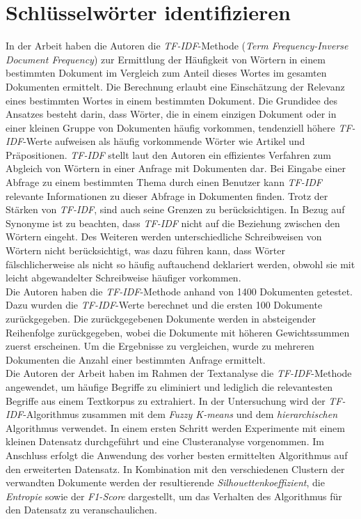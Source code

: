 \section{Schlüsselwörter identifizieren}
In der Arbeit \cite{ramos2003using} haben die Autoren \citeauthor{ramos2003using} die \emph{TF-IDF}-Methode (\emph{Term Frequency-Inverse Document Frequency}) zur Ermittlung der Häufigkeit von Wörtern in einem bestimmten Dokument im Vergleich zum Anteil dieses Wortes im gesamten Dokumenten ermittelt. Die Berechnung erlaubt eine Einschätzung der Relevanz eines bestimmten Wortes in einem bestimmten Dokument. Die Grundidee des Ansatzes besteht darin, dass Wörter, die in einem einzigen Dokument oder in einer kleinen Gruppe von Dokumenten häufig vorkommen, tendenziell höhere \emph{TF-IDF}-Werte aufweisen als häufig vorkommende Wörter wie Artikel und Präpositionen. \emph{TF-IDF} stellt laut den Autoren ein effizientes Verfahren zum Abgleich von Wörtern in einer Anfrage mit Dokumenten dar. Bei Eingabe einer Abfrage zu einem bestimmten Thema durch einen Benutzer kann \emph{TF-IDF} relevante Informationen zu dieser Abfrage in Dokumenten finden. Trotz der Stärken von \emph{TF-IDF}, sind auch seine Grenzen zu berücksichtigen. In Bezug auf Synonyme ist zu beachten, dass \emph{TF-IDF} nicht auf die Beziehung zwischen den Wörtern eingeht. Des Weiteren werden unterschiedliche Schreibweisen von Wörtern nicht berücksichtigt, was dazu führen kann, dass Wörter fälschlicherweise als nicht so häufig auftauchend deklariert werden, obwohl sie mit leicht abgewandelter Schreibweise häufiger vorkommen.\\
Die Autoren haben die \emph{TF-IDF}-Methode anhand von 1400 Dokumenten getestet. Dazu wurden die \emph{TF-IDF}-Werte berechnet und die ersten 100 Dokumente zurückgegeben. Die zurückgegebenen Dokumente werden in absteigender Reihenfolge zurückgegeben, wobei die Dokumente mit höheren Gewichtssummen zuerst erscheinen. Um die Ergebnisse zu vergleichen, wurde zu mehreren Dokumenten die Anzahl einer bestimmten Anfrage ermittelt.\\

Die Autoren \citeauthor{bafna2016document} der Arbeit \cite{bafna2016document} haben im Rahmen der Textanalyse die \emph{TF-IDF}-Methode angewendet, um häufige Begriffe zu eliminiert und lediglich die relevantesten Begriffe aus einem Textkorpus zu extrahiert. In der Untersuchung wird der \emph{TF-IDF}-Algorithmus zusammen mit dem \emph{Fuzzy K-means} und dem \emph{hierarchischen} Algorithmus verwendet. In einem ersten Schritt werden Experimente mit einem kleinen Datensatz durchgeführt und eine Clusteranalyse vorgenommen. Im Anschluss erfolgt die Anwendung des vorher besten ermittelten Algorithmus auf den erweiterten Datensatz. In Kombination mit den verschiedenen Clustern der verwandten Dokumente werden der resultierende \emph{Silhouettenkoeffizient}, die \emph{Entropie} sowie der \emph{F1-Score} dargestellt, um das Verhalten des Algorithmus für den Datensatz zu veranschaulichen.\\
